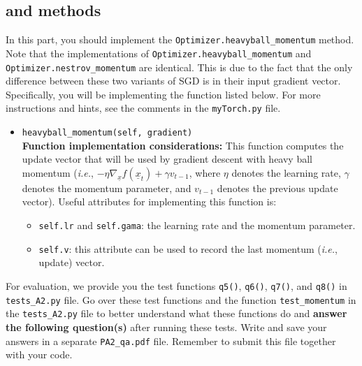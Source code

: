 \documentclass{article}
\theoremstyle{definition}
\begin{document}
\subsection{ and  methods}\label{mom}
In this part, you should implement the  \verb|Optimizer.heavyball_momentum| method. Note that the implementations of \verb|Optimizer.heavyball_momentum| and \verb|Optimizer.nestrov_momentum| are identical. This is due to the fact that the only difference between these two variants of SGD is in their input gradient vector. Specifically, you will be implementing the function listed below. For more instructions and hints, see the comments in the \verb|myTorch.py| file.
\begin{itemize}
	\item{\verb|heavyball_momentum(self, gradient)|\\\textbf{Function implementation considerations:}
		This function computes the update vector that will be used by gradient descent with heavy ball momentum (\emph{i.e.}, $-\eta \nabla_{\!\underline{x}}f(\underline{x}_t) + \gamma v_{t-1}$, where $\eta$ denotes the learning rate, $\gamma$ denotes the momentum parameter, and $v_{t-1}$ denotes the previous update vector). 
		Useful attributes for implementing this function is: 
		\begin{itemize}
			\item \verb|self.lr| and \verb|self.gama|: the learning rate and the momentum parameter.
			\item \verb|self.v|: this attribute can be used to record the last momentum (\emph{i.e.}, update) vector. 
	\end{itemize}}
\end{itemize}
For evaluation, we provide you the test functions \verb|q5()|, \verb|q6()|, \verb|q7()|, and \verb|q8()| in \verb|tests_A2.py| file. Go over these test functions and the function \verb|test_momentum| in the \verb|tests_A2.py| file to better understand what these functions do and \textbf{answer the following question(s)} after running these tests. Write and save your answers in a separate \verb|PA2_qa.pdf| file. Remember to submit this file together with your code.
\end{document}
